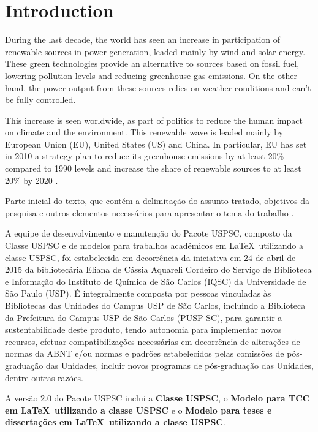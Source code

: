 
\chapter[Introduction]{Introduction}

During the last decade, the world has seen an increase in participation of renewable sources in power generation, leaded mainly by wind and solar energy. These green technologies provide an alternative to sources based on fossil fuel, lowering pollution levels and reducing greenhouse gas emissions. On the other hand, the power output from these sources relies on weather conditions and can't be fully controlled.

This increase is seen worldwide, as part of politics to reduce the human impact on climate and the environment. This renewable wave is leaded mainly by European Union (EU), United States (US) and China. In particular, EU has set in 2010 a strategy plan to reduce its greenhouse emissions by at least 20\% compared to 1990 levels and increase the share of renewable sources to at least 20\% by 2020 \cite{Europe2020}. 


Parte inicial do texto, que contém a delimitação do assunto tratado, objetivos da pesquisa e outros elementos necessários para apresentar o tema do trabalho \cite{sibi2016}.

A equipe de desenvolvimento e manutenção do Pacote USPSC, composto da Classe USPSC e de modelos para trabalhos acadêmicos em \LaTeX\ utilizando a classe USPSC, foi estabelecida em decorrência da iniciativa em 24 de abril de 2015 da bibliotecária Eliana de Cássia Aquareli Cordeiro do Serviço de Biblioteca e Informação do Instituto de Química de São Carlos (IQSC) da Universidade de São Paulo (USP). É integralmente composta por pessoas vinculadas às Bibliotecas das Unidades do Campus USP de São Carlos, incluindo a Biblioteca da Prefeitura do Campus USP de São Carlos (PUSP-SC), para garantir a sustentabilidade deste produto, tendo autonomia para implementar novos recursos, efetuar compatibilizações necessárias em decorrência de alterações de normas da ABNT e/ou normas e padrões estabelecidos pelas comissões de pós-graduação das Unidades, incluir novos programas de pós-graduação das Unidades, dentre outras razões. 

A versão 2.0 do Pacote USPSC inclui a \textbf{Classe USPSC}, o \textbf{Modelo para TCC em \LaTeX\ utilizando a classe USPSC} e o \textbf{Modelo para teses e dissertações em \LaTeX\ utilizando a classe USPSC}.

